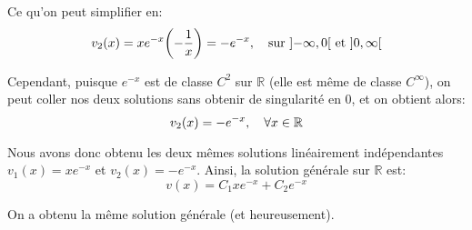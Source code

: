 \documentclass[a4paper]{article}
\begin{document}
{{        Ce qu'on peut simplifier en:
        \[v_2\left(x\right) = x e^{-x} \left(-\frac{1}{x}\right) = -e^{-x}, \mathspace \text{sur } \left]-\infty, 0\right[ \text{ et } \left]0, \infty\right[\]
        

        Cependant, puisque $e^{-x}$ est de classe $C^2$ sur $\mathbb{R}$ (elle est même de classe $C^{\infty}$), on peut coller nos deux solutions sans obtenir de singularité en 0, et on obtient alors: 
        \[v_2\left(x\right) = -e^{-x}, \mathspace\forall x \in \mathbb{R}\]
        
        Nous avons donc obtenu les deux mêmes solutions linéairement indépendantes $v_1\left(x\right) = xe^{-x}$ et $v_2\left(x\right) = -e^{-x}$. Ainsi, la solution générale sur $\mathbb{R}$ est: 
        \[v\left(x\right) = C_1 x e^{-x} + C_2e^{-x}\]

        On a obtenu la même solution générale (et heureusement).
    }

    
}
\end{document}
